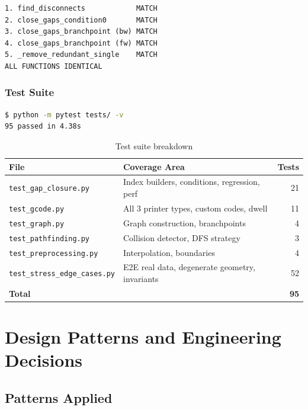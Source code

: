 \documentclass[11pt,a4paper]{article}
\begin{document}
\begin{lstlisting}[language={},numbers=none,basicstyle=\ttfamily\small]
1. find_disconnects            MATCH
2. close_gaps_condition0       MATCH
3. close_gaps_branchpoint (bw) MATCH
4. close_gaps_branchpoint (fw) MATCH
5. _remove_redundant_single    MATCH
ALL FUNCTIONS IDENTICAL
\end{lstlisting}

\subsubsection{Test Suite}

\begin{lstlisting}[language=bash,numbers=none]
$ python -m pytest tests/ -v
95 passed in 4.38s
\end{lstlisting}

\begin{table}[H]
\centering
\caption{Test suite breakdown}
\begin{tabular}{llr}
\toprule
\textbf{File} & \textbf{Coverage Area} & \textbf{Tests} \\
\midrule
\texttt{test\_gap\_closure.py} & Index builders, conditions, regression, perf & 21 \\
\texttt{test\_gcode.py} & All 3 printer types, custom codes, dwell & 11 \\
\texttt{test\_graph.py} & Graph construction, branchpoints & 4 \\
\texttt{test\_pathfinding.py} & Collision detector, DFS strategy & 3 \\
\texttt{test\_preprocessing.py} & Interpolation, boundaries & 4 \\
\texttt{test\_stress\_edge\_cases.py} & E2E real data, degenerate geometry, invariants & 52 \\
\midrule
\textbf{Total} & & \textbf{95} \\
\bottomrule
\end{tabular}
\end{table}


\section{Design Patterns and Engineering Decisions}

\subsection{Patterns Applied}
\end{document}
